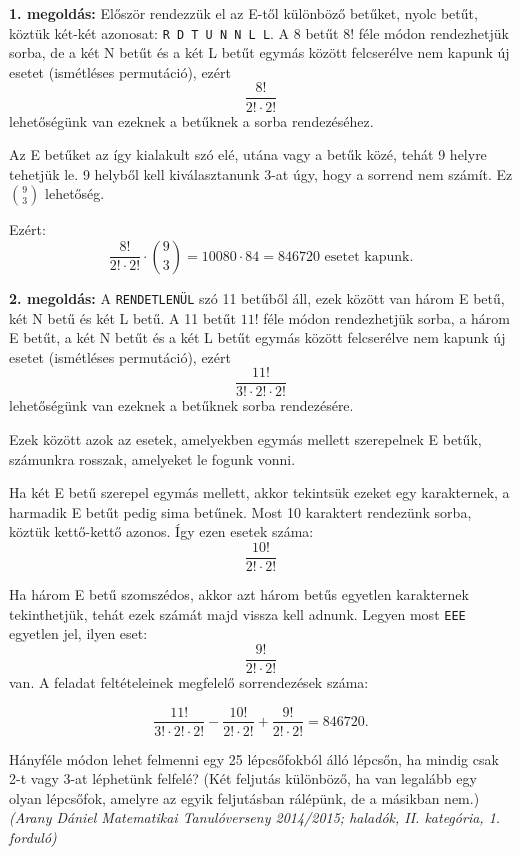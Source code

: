 \begin{solution}
\textbf{1. megoldás:} Először rendezzük el az E-től különböző betűket,
nyolc betűt, köztük két-két azonosat: \texttt{R D T U N N L L}. A
8 betűt $8!$ féle módon rendezhetjük sorba, de a két N betűt és a
két L betűt egymás között felcserélve nem kapunk új esetet (ismétléses
permutáció), ezért 
\[
\frac{8!}{2!\cdot2!}
\]
lehetőségünk van ezeknek a betűknek a sorba rendezéséhez.

Az E betűket az így kialakult szó elé, utána vagy a betűk közé, tehát
9 helyre tehetjük le. 9 helyből kell kiválasztanunk 3-at úgy, hogy
a sorrend nem számít. Ez $\binom{9}{3}$ lehetőség.

Ezért: 
\[
\frac{8!}{2!\cdot2!}\cdot\binom{9}{3}=10080\cdot84=846720\text{ esetet kapunk.}
\]

\medskip{}

\textbf{2. megoldás:} A \texttt{RENDETLENÜL} szó 11 betűből áll, ezek
között van három E betű, két N betű és két L betű. A 11 betűt $11!$
féle módon rendezhetjük sorba, a három E betűt, a két N betűt és a
két L betűt egymás között felcserélve nem kapunk új esetet (ismétléses
permutáció), ezért 
\[
\frac{11!}{3!\cdot2!\cdot2!}
\]
lehetőségünk van ezeknek a betűknek sorba rendezésére.

Ezek között azok az esetek, amelyekben egymás mellett szerepelnek
E betűk, számunkra rosszak, amelyeket le fogunk vonni.

Ha két E betű szerepel egymás mellett, akkor tekintsük ezeket egy
karakternek, a harmadik E betűt pedig sima betűnek. Most 10 karaktert
rendezünk sorba, köztük kettő-kettő azonos. Így ezen esetek száma:
\[
\frac{10!}{2!\cdot2!}
\]

Ha három E betű szomszédos, akkor azt három betűs egyetlen karakternek
tekinthetjük, tehát ezek számát majd vissza kell adnunk. Legyen most
\texttt{EEE} egyetlen jel, ilyen eset: 
\[
\frac{9!}{2!\cdot2!}
\]
van. A feladat feltételeinek megfelelő sorrendezések száma:

\[
\frac{11!}{3!\cdot2!\cdot2!}-\frac{10!}{2!\cdot2!}+\frac{9!}{2!\cdot2!}=846720.
\]
\end{solution}
\begin{extraproblem}
Hányféle módon lehet felmenni egy 25 lépcsőfokból álló lépcsőn, ha
mindig csak 2-t vagy 3-at léphetünk felfelé? (Két feljutás különböző,
ha van legalább egy olyan lépcsőfok, amelyre az egyik feljutásban
rálépünk, de a másikban nem.) \emph{(Arany Dániel Matematikai Tanulóverseny
2014/2015; haladók, II. kategória, 1. forduló) }
\end{extraproblem}

